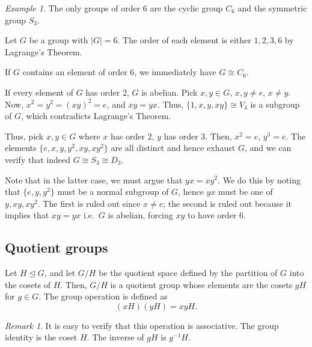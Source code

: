 \documentclass[11pt]{article}
\theoremstyle{definition}
\theoremstyle{remark}
\newtheorem*{remark}{Remark}
\newtheorem*{example}{Example}
\numberwithin{equation}{section}
\begin{document}
    \begin{example}
        The only groups of order $6$ are the cyclic group $C_6$ and the symmetric
        group $S_3$.
        
        Let $G$ be a group with $|G| = 6$. The order of each element is either $1, 2,
        3, 6$ by Lagrange's Theorem.

        If $G$ contains an element of order $6$, we immediately have $G\cong C_6$.

        If every element of $G$ has order $2$, $G$ is abelian. Pick $x, y \in G$, $x,
        y \neq e$, $x \neq y$. Now, $x^2 = y^2 = (xy)^2 = e$, and $xy = yx$. Thus,
        $\{1, x, y, xy\} \cong V_4$ is a subgroup of $G$, which contradicts
        Lagrange's Theorem.

        Thus, pick $x, y \in G$ where $x$ has order $2$, $y$ has order $3$. Then,
        $x^2 = e$, $y^3 = e$. The elements $\{e, x, y, y^2, xy, xy^2\}$ are all
        distinct and hence exhaust $G$, and we can verify that indeed $G \cong S_3
        \cong D_3$.

        Note that in the latter case, we must argue that $yx = xy^2$. We do this by
        noting that $\{e, y, y^2\}$ must be a normal subgroup of $G$, hence $yx$ must
        be one of $y, xy, xy^2$. The first is ruled out since $x \neq e$; the second
        is ruled out because it implies that $xy = yx$ i.e.\ $G$ is abelian, forcing
        $xy$ to have order $6$.
    \end{example}

    \subsection{Quotient groups}
    \begin{definition}
        Let $H \trianglelefteq G$, and let $G/H$ be the quotient space defined by the
        partition of $G$ into the cosets of $H$. Then, $G/H$ is a quotient group
        whose elements are the cosets $gH$ for $g \in G$. The group operation is
        defined as \[
            (xH)(yH) = xyH.
        \] 
        \begin{remark}
            It is easy to verify that this operation is associative. The group
            identity is the coset $H$. The inverse of $gH$ is $g^{-1}H$.
        \end{remark}
    \end{definition}
\end{document}
